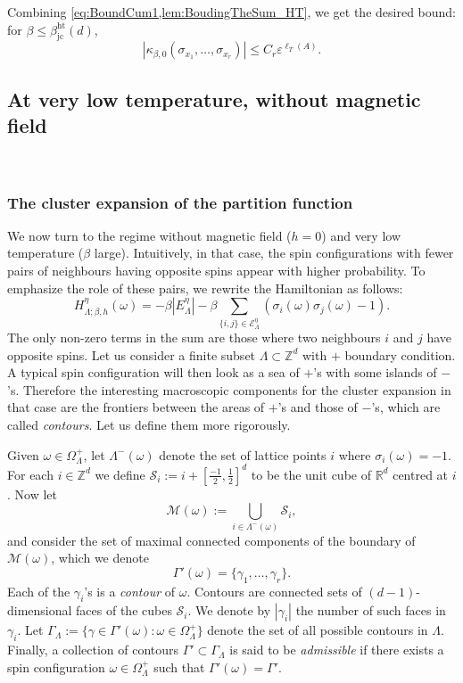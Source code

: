 \documentclass{amsart}
\newcommand{\field}[1]{\mathbb{#1}}
\newcommand{\Z}{\field{Z}}
\newcommand{\R}{\field{R}}
\def\eps{\varepsilon}
\def\ka{\kappa}
\def\EEE{\mathcal{E}}
\numberwithin{equation}{section}
\theoremstyle{remark}
\begin{document}
Combining \cref{eq:BoundCum1,lem:BoudingTheSum_HT}, we get the desired bound:
for $\beta \le \beta^{\text{ht}}_{\text{jc}}(d)$,
\[ |\ka_{\beta,0}(\sigma_{x_1},\dots,\sigma_{x_r}) | \le C_r \eps^{\ell_T(A)}.\]







\medskip





\subsection{At very low temperature, without magnetic field}~ 
\label{Sect:CE_LT}


\subsubsection{The cluster expansion of the partition function}
We now turn to the regime without magnetic field ($h=0$) and very low temperature ($\beta$ large).
Intuitively, in that case, the spin configurations with fewer pairs of neighbours having opposite spins appear with higher probability. 
To emphasize the role of these pairs, we rewrite the Hamiltonian as follows:
$$H^{\eta}_{\Lambda;\beta, h} (\omega)= -\beta |E^{\eta}_{\Lambda}| -\beta \sum_{\{i,j\} \in \EEE^{\eta}_{\Lambda} } (\sigma_i(\omega) \sigma_j(\omega) - 1).$$
The only non-zero terms in the sum are those where two neighbours $i$ and $j$ have opposite spins.
Let us consider a finite subset $\Lambda \subset \Z^d$ with $+$ boundary condition. A typical spin configuration will then look as a sea of $+$'s with some islands of $-$'s. Therefore the interesting macroscopic components for the cluster expansion in that case are the frontiers between the areas of $+$'s and those of $-$'s, which are called \emph{contours}. Let us define them more rigorously.

Given $\omega \in \Omega_{\Lambda}^{+}$, let $\Lambda^{-}(\omega)$ denote the set of lattice points $i$ where $\sigma_i(\omega)=-1.$
For each $i \in \Z^d$ we define $\mathcal{S}_i := i + [\frac{-1}{2},\frac{1}{2}]^d$ to be the unit cube of $\R^d$ centred at $i$. Now let
$$\mathcal{M}(\omega) := \bigcup_{i \in \Lambda^{-}(\omega)} \mathcal{S}_i,$$
and consider the set of maximal connected components of the boundary of $\mathcal{M}(\omega)$, which we denote
$$\Gamma'(\omega)= \{ \gamma_1, \dots, \gamma_r \}.$$
Each of the $\gamma_i$'s is a \emph{contour} of $\omega.$ Contours are connected sets of $(d-1)$-dimensional faces of the cubes $\mathcal{S}_i$. We denote by $| \gamma_i|$ the number of such faces in $\gamma_i$.
Let $\Gamma_{\Lambda} := \{ \gamma \in \Gamma'(\omega) : \omega \in \Omega_{\Lambda}^{+} \}$ denote the set of all possible contours in $\Lambda.$ Finally, a collection of contours $\Gamma' \subset \Gamma_{\Lambda}$ is said to be \emph{admissible} if there exists a spin configuration $\omega \in \Omega_{\Lambda}^{+}$ such that $\Gamma'(\omega) =\Gamma'.$
\end{document}
